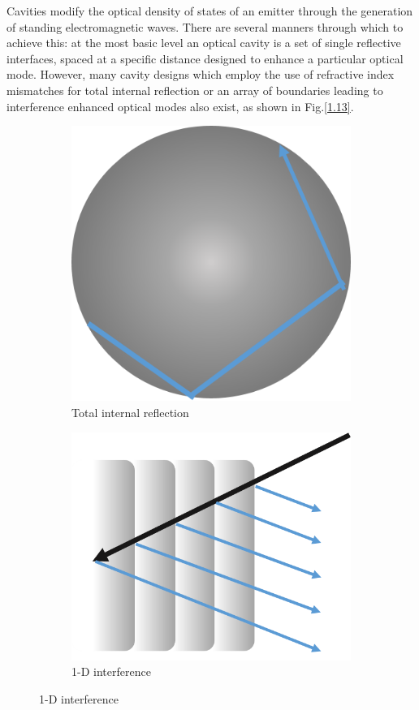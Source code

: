 Cavities modify the optical density of states of an emitter through the generation of standing electromagnetic waves. There are several manners through which to achieve this: at the most basic level an optical cavity is a set of single reflective interfaces, spaced at a specific distance designed to enhance a particular optical mode. However, many cavity designs which employ the use of refractive index mismatches for total internal reflection or an array of boundaries leading to interference enhanced optical modes also exist, as shown in Fig.\ref{1.13}.
\begin{figure}
	\begin{subfigure}[b]{0.3\textwidth}
		\centering
		\includegraphics[width=.75\linewidth]{Figs/Ch1/mdisk}
		\caption{Total internal reflection}
		
	\end{subfigure}%
	\hspace*{0.5cm}
	\begin{subfigure}[b]{0.3\textwidth}
		\centering
		\includegraphics[width=.85\linewidth]{Figs/Ch1/dbr}
		\caption{1-D interference}
		

\end{subfigure}
\end{figure}
